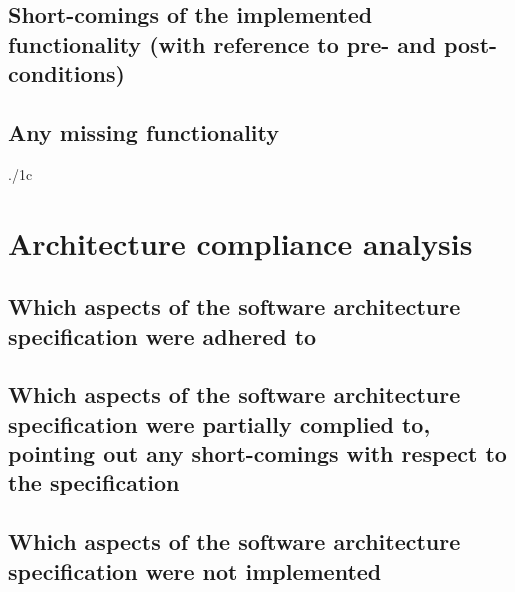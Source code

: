 \documentclass{article}
\begin{document}
\subsection{Short-comings of the implemented functionality (with reference to pre- and post-conditions)}


\subsection{Any missing functionality}
 {./1c}


\section{Architecture compliance analysis}
\subsection{Which aspects of the software architecture specification were adhered to}


\subsection{Which aspects of the software architecture specification were partially complied to, pointing out any short-comings with respect to the specification}


\subsection{Which aspects of the software architecture specification were not implemented}

\end{document}
